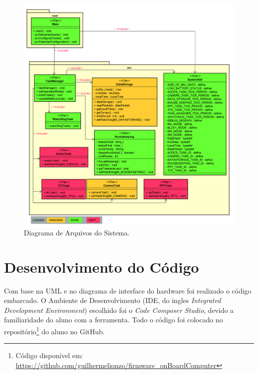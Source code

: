 \begin{itemize}
\begin{figure}[h]
	\centering
	\caption{Diagrama de Arquivos do Sistema.}
	\includegraphics[keepaspectratio=true,scale=0.36]{figuras/CSS.png}
	
	\label{uml_da}
\end{figure}

\end{itemize}


\section{Desenvolvimento do Código}

Com base na UML e no diagrama de interface do hardware foi realizado o código embarcado. O Ambiente de Desenvolvimento (IDE, do ingles \textit{Integrated Development Environment}) escolhido foi o \textit{Code Composer Studio}, devido  a familiaridade do aluno com a ferramenta. Todo o código foi colocado no repositório\footnote{Código disponível em: \url{https://github.com/guilhermelionzo/firmware_onBoardComputer}} do aluno no GitHub. 

